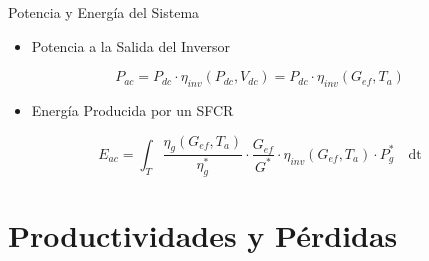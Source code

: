 \documentclass[aspectratio=169, usenames,svgnames,dvipsnames]{beamer}
\begin{document}
\begin{frame}[label={sec:org73db529}]{Potencia y Energía del Sistema}
\begin{itemize}
\item \alert{Potencia} a la Salida del Inversor
\end{itemize}
\[
P_{ac} = P_{dc} \cdot \eta_{inv}(P_{dc}, V_{dc}) =  P_{dc} \cdot \eta_{inv}(G_{ef}, T_a)
\]

\begin{itemize}
\item \alert{Energía} Producida por un SFCR
\end{itemize}
\[
  E_{ac} = \int_T \frac{\eta_g(G_{ef}, T_a)}{\eta_g^*} \cdot
  \frac{G_{ef}}{G^*} \cdot \eta_{inv}(G_{ef}, T_a) \cdot P_g^*\quad \mathrm{dt}
\]
\end{frame}

\section{Productividades y Pérdidas}
\label{sec:orgfa9a064}
\end{document}
